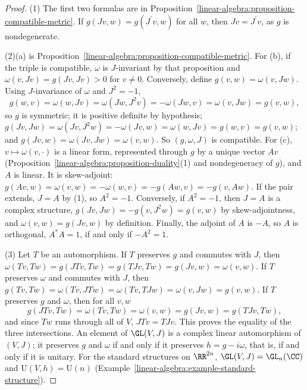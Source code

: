 \begin{proof}
(1) The first two formulas are in Proposition~\ref{linear-algebra:proposition-compatible-metric}. If $g(Jv, w) = g(J^{\prime}v, w)$ for all $w$, then $Jv = J^{\prime}v$, as $g$ is nondegenerate.

(2)(a) is Proposition~\ref{linear-algebra:proposition-compatible-metric}. For (b), if the triple is compatible, $\omega$ is $J$-invariant by that proposition and $\omega(v, Jv) = g(Jv, Jv) > 0$ for
$v \neq 0$. Conversely, define $g(v, w) = \omega(v, Jw)$. Using $J$-invariance of $\omega$ and $J^2 = -1$,
\[
g(w, v) = \omega(w, Jv) = \omega(Jw, J^2v) = -\omega(Jw, v) = \omega(v, Jw) = g(v, w),
\]
so $g$ is symmetric; it is positive definite by hypothesis; $g(Jv, Jw) = \omega(Jv, J^2w) = -\omega(Jv, w) = \omega(w, Jv) = g(w, v) = g(v, w)$; and $g(Jv, w) = \omega(Jv, Jw) = \omega(v, w)$. So
$(g, \omega, J)$ is compatible. For (c), $v \mapsto \omega(v, \cdot)$ is a linear form, represented through $g$ by a unique vector $Av$ (Proposition~\ref{linear-algebra:proposition-duality}(1) and
nondegeneracy of $g$), and $A$ is linear. It is skew-adjoint: $g(Av, w) = \omega(v, w) = -\omega(w, v) = -g(Aw, v) = -g(v, Aw)$. If the pair extends, $J = A$ by (1), so $A^2 = -1$. Conversely, if
$A^2 = -1$, then $J = A$ is a complex structure, $g(Jv, Jw) = -g(v, J^2w) = g(v, w)$ by skew-adjointness, and $\omega(v, w) = g(Jv, w)$ by definition. Finally, the adjoint of $A$ is $-A$, so $A$ is
orthogonal, $A^*A = 1$, if and only if $-A^2 = 1$.

(3) Let $T$ be an automorphism. If $T$ preserves $g$ and commutes with $J$, then $\omega(Tv, Tw) = g(JTv, Tw) = g(TJv, Tw) = g(Jv, w) = \omega(v, w)$. If $T$ preserves $\omega$ and commutes with $J$, then
$g(Tv, Tw) = \omega(Tv, JTw) = \omega(Tv, TJw) = \omega(v, Jw) = g(v, w)$. If $T$ preserves $g$ and $\omega$, then for all $v, w$
\[
g(JTv, Tw) = \omega(Tv, Tw) = \omega(v, w) = g(Jv, w) = g(TJv, Tw),
\]
and since $Tw$ runs through all of $V$, $JTv = TJv$. This proves the equality of the three intersections. An element of $\GL(V, J)$ is a complex linear automorphism of $(V, J)$; it preserves $g$ and
$\omega$ if and only if it preserves $h = g - i\omega$, that is, if and only if it is unitary. For the standard structures on $\RR^{2n}$, $\GL(V, J) = \GL_n(\CC)$ and $\mathrm{U}(V, h) = \mathrm{U}(n)$
(Example~\ref{linear-algebra:example-standard-structure}).
\end{proof}

